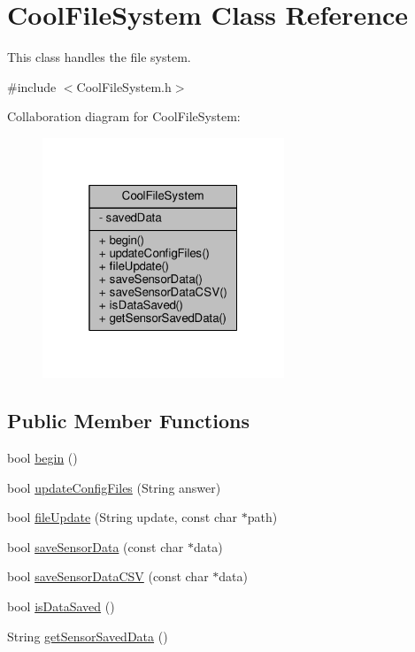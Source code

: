 \hypertarget{classCoolFileSystem}{}\section{Cool\+File\+System Class Reference}
\label{classCoolFileSystem}


This class handles the file system.  




{\ttfamily \#include $<$Cool\+File\+System.\+h$>$}



Collaboration diagram for Cool\+File\+System\+:
\nopagebreak
\begin{figure}[H]
\begin{center}
\leavevmode
\includegraphics[width=205pt]{classCoolFileSystem__coll__graph}
\end{center}
\end{figure}
\subsection*{Public Member Functions}
\begin{DoxyCompactItemize}
\item 
bool \hyperlink{classCoolFileSystem_a6ba6f666ed4c530174f8569d2c636748}{begin} ()
\item 
bool \hyperlink{classCoolFileSystem_adfa8e2e80641ae6f0cceabd348a9b841}{update\+Config\+Files} (String answer)
\item 
bool \hyperlink{classCoolFileSystem_a13f2958f5b87757c31fc53797a30d23a}{file\+Update} (String update, const char $\ast$path)
\item 
bool \hyperlink{classCoolFileSystem_afa3a4feae94871d4d3b6bebb701c2e67}{save\+Sensor\+Data} (const char $\ast$data)
\item 
bool \hyperlink{classCoolFileSystem_ab78704d5d21ce10fc6f1138ab5ab46c8}{save\+Sensor\+Data\+C\+SV} (const char $\ast$data)
\item 
bool \hyperlink{classCoolFileSystem_a5a7eaeea7a9fbf8aaef651d862fa3b5b}{is\+Data\+Saved} ()
\item 
String \hyperlink{classCoolFileSystem_a5c58bca3735c0ed3efb268d70ef998ef}{get\+Sensor\+Saved\+Data} ()
\end{DoxyCompactItemize}
